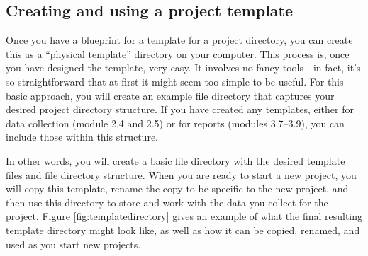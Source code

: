 \documentclass[]{tufte-book}
\begin{document}
\subsection{Creating and using a project template}\label{creating-and-using-a-project-template}

Once you have a blueprint for a template for a project directory, you can create
this as a ``physical template'' directory on your computer.
This process is, once you have designed the template, very easy. It involves no
fancy tools---in fact, it's so straightforward that at first it might seem too
simple to be useful. For this basic approach, you will create an example file
directory that captures your desired project directory structure. If you have
created any templates, either for data collection (module 2.4 and 2.5) or for
reports (modules 3.7--3.9), you can include those within this structure.

In other words, you will create a basic file directory with the desired template
files and file directory structure. When you are ready to start a new project,
you will copy this template, rename the copy to be specific to the new project,
and then use this directory to store and work with the data you collect for the
project. Figure \ref{fig:templatedirectory} gives an example of what the final
resulting template directory might look like, as well as how it can be copied,
renamed, and used as you start new projects.
\end{document}
